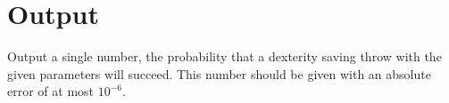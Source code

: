 \section*{Output}

Output a single number, the probability that a dexterity saving throw
with the given parameters will succeed.  This number should be given
with an absolute error of at most $10^{-6}$.
